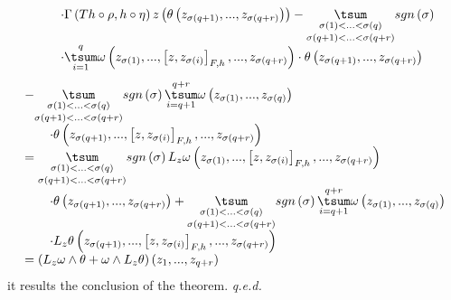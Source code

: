 \documentclass[11pt]{article}
\begin{document}
\begin{equation*}
\begin{array}{l}
\qquad \cdot \Gamma \left( Th\circ \rho ,h\circ \eta \right) z\left( \theta
\left( z_{\sigma \left( q+1\right) },...,z_{\sigma \left( q+r\right)
}\right) \right) -\underset{\sigma \left( q+1\right) <...<\sigma \left(
q+r\right) }{\underset{\sigma \left( 1\right) <...<\sigma \left( q\right) }{%
\tsum }}sgn\left( \sigma \right) \\
\qquad \cdot \overset{q}{\underset{i=1}{\tsum }}\omega \left( z_{\sigma
\left( 1\right) },...,\left[ z,z_{\sigma \left( i\right) }\right]
_{F,h},...,z_{\sigma \left( q+r\right) }\right) \cdot \theta \left(
z_{\sigma \left( q+1\right) },...,z_{\sigma \left( q+r\right) }\right)%
\end{array}%
\end{equation*}%
\begin{equation*}
\begin{array}{l}
-\underset{\sigma \left( q+1\right) <...<\sigma \left( q+r\right) }{\underset%
{\sigma \left( 1\right) <...<\sigma \left( q\right) }{\tsum }}sgn\left(
\sigma \right) \overset{q+r}{\underset{i=q+1}{\tsum }}\omega \left(
z_{\sigma \left( 1\right) },...,z_{\sigma \left( q\right) }\right) \\
\qquad \cdot \theta \left( z_{\sigma \left( q+1\right) },...,\left[
z,z_{\sigma \left( i\right) }\right] _{F,h},...,z_{\sigma \left( q+r\right)
}\right) \\
=\underset{\sigma \left( q+1\right) <...<\sigma \left( q+r\right) }{\underset%
{\sigma \left( 1\right) <...<\sigma \left( q\right) }{\tsum }}sgn\left(
\sigma \right) L_{z}\omega \left( z_{\sigma \left( 1\right) },...,\left[
z,z_{\sigma \left( i\right) }\right] _{F,h},...,z_{\sigma \left( q+r\right)
}\right) \\
\qquad \cdot \theta \left( z_{\sigma \left( q+1\right) },...,z_{\sigma
\left( q+r\right) }\right) +\underset{\sigma \left( q+1\right) <...<\sigma
\left( q+r\right) }{\underset{\sigma \left( 1\right) <...<\sigma \left(
q\right) }{\tsum }}sgn\left( \sigma \right) \overset{q+r}{\underset{i=q+1}{%
\tsum }}\omega \left( z_{\sigma \left( 1\right) },...,z_{\sigma \left(
q\right) }\right) \\
\qquad \cdot L_{z}\theta \left( z_{\sigma \left( q+1\right) },...,\left[
z,z_{\sigma \left( i\right) }\right] _{F,h},...,z_{\sigma \left( q+r\right)
}\right) \\
=\left( L_{z}\omega \wedge \theta +\omega \wedge L_{z}\theta \right) \left(
z_{1},...,z_{q+r}\right)%
\end{array}%
\end{equation*}%
it results the conclusion of the theorem. \hfill \emph{q.e.d.}
\end{document}
